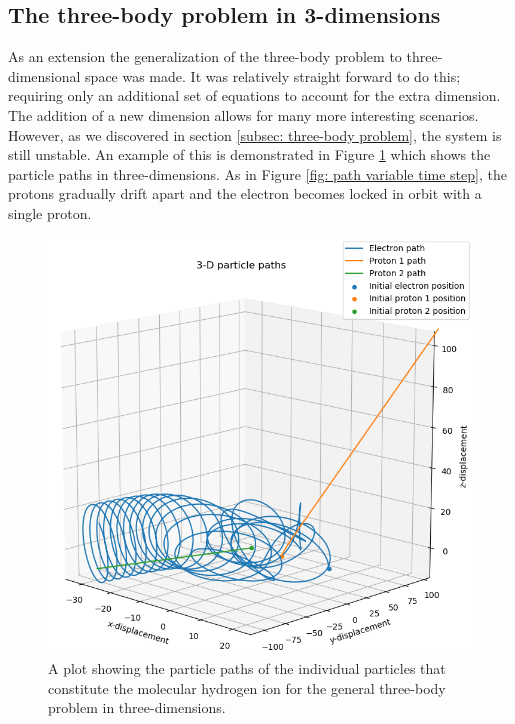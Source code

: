 \documentclass[12pt]{article} %
\numberwithin{equation}{subsection} %
\begin{document}
\subsection{The three-body problem in 3-dimensions}
As an extension the generalization of the three-body problem to three-dimensional space was made. It was relatively straight forward to do this; requiring only an additional set of equations to account for the extra dimension. The addition of a new dimension allows for many more interesting scenarios. However, as we discovered in section \ref{subsec: three-body problem}, the system is still unstable. An example of this is demonstrated in Figure \ref{fig: 3D} which shows the particle paths in three-dimensions. As in Figure \ref{fig: path variable time step}, the protons gradually drift apart and the electron becomes locked in orbit with a single proton.	
\begin{figure}[h]
    \centering
    \captionsetup{justification=centering}
	\includegraphics[scale=0.45]{images/3D2.png}
	\caption{A plot showing the particle paths of the individual particles that constitute the molecular hydrogen ion for the general three-body problem in three-dimensions.}
	\label{fig: 3D} 
	\end{figure}

\FloatBarrier
\end{document}
